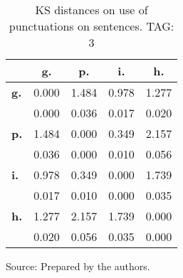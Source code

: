 \begin{table}[h!]
\begin{center}
\caption{KS distances on use of punctuations on sentences. TAG: 3}
	\label{tab:kolPct}
\begin{tabular}{| l || c | c | c | c |}\hline
 & {\bf g.} & {\bf p.} & {\bf i.} & {\bf h.} \\\hline\hline
{\bf g.} & 0.000 & 1.484 & 0.978 & 1.277 \\
{\bf } & 0.000 & 0.036 & 0.017 & 0.020 \\\hline
{\bf p.} & 1.484 & 0.000 & 0.349 & 2.157 \\
{\bf } & 0.036 & 0.000 & 0.010 & 0.056 \\\hline
{\bf i.} & 0.978 & 0.349 & 0.000 & 1.739 \\
{\bf } & 0.017 & 0.010 & 0.000 & 0.035 \\\hline
{\bf h.} & 1.277 & 2.157 & 1.739 & 0.000 \\
{\bf } & 0.020 & 0.056 & 0.035 & 0.000 \\\hline
\end{tabular}
\begin{flushleft}
		Source: Prepared by the authors.\
\end{flushleft}
\end{center}
\end{table}
